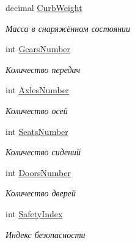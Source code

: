 \begin{DoxyCompactItemize}
decimal \hyperlink{class_r_t_1_1_parsing_libs_1_1_models_1_1_automoto_additional_info_a015fa43e59648a0e583fe8d2318efbed}{Curb\+Weight}
\begin{DoxyCompactList}\small\item\em Масса в снаряжённом состоянии \end{DoxyCompactList}\item 
int \hyperlink{class_r_t_1_1_parsing_libs_1_1_models_1_1_automoto_additional_info_aa5cd9ab7ae5aa3b035a1f3392bdd2423}{Gears\+Number}
\begin{DoxyCompactList}\small\item\em Количество передач \end{DoxyCompactList}\item 
int \hyperlink{class_r_t_1_1_parsing_libs_1_1_models_1_1_automoto_additional_info_a96c8c70347ae9caec07b6da5f9420379}{Axles\+Number}
\begin{DoxyCompactList}\small\item\em Количество осей \end{DoxyCompactList}\item 
int \hyperlink{class_r_t_1_1_parsing_libs_1_1_models_1_1_automoto_additional_info_adfd8182fdce4a0ee167921ab21b8df07}{Seats\+Number}
\begin{DoxyCompactList}\small\item\em Количество сидений \end{DoxyCompactList}\item 
int \hyperlink{class_r_t_1_1_parsing_libs_1_1_models_1_1_automoto_additional_info_a357adcc1978f3926cbc6e2621054b7d6}{Doors\+Number}
\begin{DoxyCompactList}\small\item\em Количество дверей \end{DoxyCompactList}\item 
int \hyperlink{class_r_t_1_1_parsing_libs_1_1_models_1_1_automoto_additional_info_a4a2113f125dde37559b01c1df7aa5238}{Safety\+Index}
\begin{DoxyCompactList}\small\item\em Индекс безопасности \end{DoxyCompactList}\item 

\end{DoxyCompactItemize}
